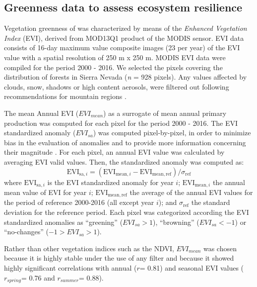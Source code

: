 \subsection{Greenness data to assess ecosystem resilience}\label{sec:dendroEVI}
Vegetation greenness of \Qpy was characterized by means of the \emph{Enhanced Vegetation Index} (EVI), derived from MOD13Q1 product of the MODIS sensor. EVI data consists of 16-day maximum value composite images (23 per year) of the EVI value with a spatial resolution of 250 m x 250 m. MODIS EVI data were compiled for the period 2000 - 2016. We selected the pixels covering the distribution of \Qpy forests in Sierra Nevada (\emph{n} = 928 pixels). Any values affected by clouds, snow, shadows or high content aerosols, were filtered out following recommendations for mountain regions \autocite{ReyesDiezetal2015ImplicacionesFiltrado}.

The mean Annual EVI (\(EVI_{mean}\)) as a surrogate of mean annual primary production was computed for each pixel for the period 2000 - 2016. The EVI standardized anomaly (\(EVI_{sa}\)) was computed pixel-by-pixel, in order to minimize bias in the evaluation of anomalies and to provide more information concerning their magnitude \autocite{Samantaetal2012InterpretationVariations}. For each pixel, an annual EVI value was calculated by averaging EVI valid values. Then, the standardized anomaly was computed as: \[\mathrm{EVI_{sa,\mathit{i}}}= (\mathrm{EVI_{mean,\mathit{i}}-EVI_{mean,ref}})\Big/\sigma_{\mathrm{ref}}\]
where \(\mathrm{EVI_{sa,\mathit{i}}}\) is the EVI standardized anomaly for year \(i\); \(\mathrm{EVI_{mean,\mathit{i}}}\) the annual mean value of EVI for year \(i\); \(\mathrm{EVI_{mean,ref}}\) the average of the annual EVI values for the period of reference 2000-2016 (all except year \(i\)); and \(\sigma_{\mathrm{ref}}\) the standard deviation for the reference period. Each pixel was categorized according the EVI standardized anomalies as ``greening'' (\(EVI_{sa} > 1\)), ``browning'' (\(EVI_{sa} <- 1\)) or ``no-changes'' (\(-1 > EVI_{sa} > 1\))\autocite{Samantaetal2012InterpretationVariations}.

Rather than other vegetation indices such as the NDVI, \(EVI_{mean}\) was chosen because it is highly stable under the use of any filter \autocite{ReyesDiezetal2015ImplicacionesFiltrado} and because it showed highly significant correlations with annual (\(r\)= 0.81) and seasonal EVI values (\(r_{spring}\)= 0.76 and \(r_{summer}\)= 0.88).

